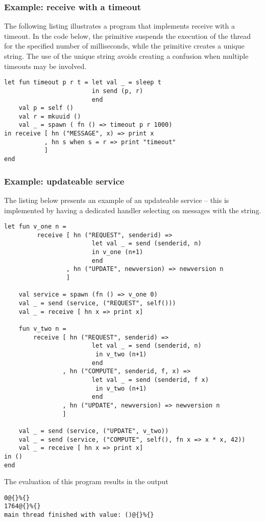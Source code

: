 \subsubsection{Example: receive with a timeout}
The following listing illustrates a program that implements
receive with a timeout. In the code below, the primitive 
suspends the execution of the thread for the specified number of milliseconds,
while the primitive  creates a unique string.
The use of the unique string avoids creating a confusion when multiple
timeouts may be involved.
\begin{lstlisting}
let fun timeout p r t = let val _ = sleep t
                        in send (p, r)
                        end
    val p = self () 
    val r = mkuuid () 
    val _ = spawn ( fn () => timeout p r 1000)    
in receive [ hn ("MESSAGE", x) => print x
           , hn s when s = r => print "timeout" 
           ]
end	
\end{lstlisting}

\subsubsection{Example: updateable service}
The listing below presents an example of an updateable service -- 
this is implemented by having a dedicated handler selecting on 
messages with the  string.

\begin{lstlisting}
let fun v_one n =
         receive [ hn ("REQUEST", senderid) => 
                        let val _ = send (senderid, n) 
                        in v_one (n+1) 
                        end
                 , hn ("UPDATE", newversion) => newversion n
                 ]
                 
    val service = spawn (fn () => v_one 0)
    val _ = send (service, ("REQUEST", self()))
    val _ = receive [ hn x => print x]
                    
    fun v_two n =
        receive [ hn ("REQUEST", senderid) => 
                        let val _ = send (senderid, n) 
                         in v_two (n+1) 
                        end
                , hn ("COMPUTE", senderid, f, x) =>
                        let val _ = send (senderid, f x)
                         in v_two (n+1)
                        end
                , hn ("UPDATE", newversion) => newversion n
                ]

    val _ = send (service, ("UPDATE", v_two))
    val _ = send (service, ("COMPUTE", self(), fn x => x * x, 42))
    val _ = receive [ hn x => print x]
in ()
end    
\end{lstlisting}
The evaluation of this program results in the output
\begin{verbatim}
0@{}%{}
1764@{}%{}
main thread finished with value: ()@{}%{}
\end{verbatim}

